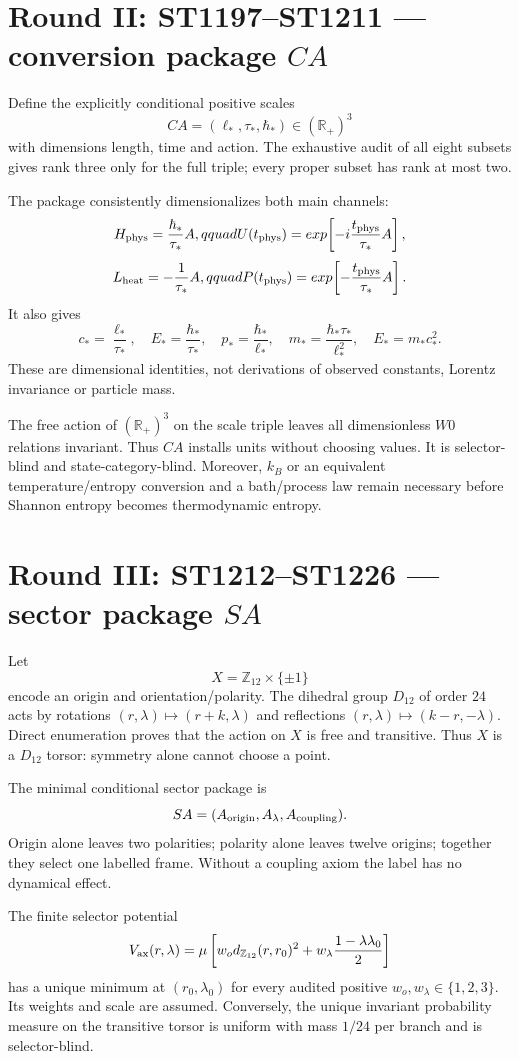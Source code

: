 \documentclass[11pt,a4paper]{article}
\begin{document}
\section{Round II: ST1197--ST1211 --- conversion package $CA$}

Define the explicitly conditional positive scales
\[
 CA=(\ell_*,\tau_*,\hbar_*)\in(\mathbb R_+)^3
\]
with dimensions length, time and action.  The exhaustive audit of all eight
subsets gives rank three only for the full triple; every proper subset has rank
at most two.

The package consistently dimensionalizes both main channels:
\[
 H_{\rm phys}=\frac{\hbar_*}{\tau_*}A,qquad
 U(t_{\rm phys})=exp\!\left[-i\frac{t_{\rm phys}}{\tau_*}A\right],
\]
\[
 L_{\rm heat}=-\frac1{\tau_*}A,qquad
 P(t_{\rm phys})=exp\!\left[-\frac{t_{\rm phys}}{\tau_*}A\right].
\]
It also gives
\[
 c_*=\frac{\ell_*}{\tau_*},\quad
 E_*=\frac{\hbar_*}{\tau_*},\quad
 p_*=\frac{\hbar_*}{\ell_*},\quad
 m_*=\frac{\hbar_*\tau_*}{\ell_*^2},\quad E_*=m_*c_*^2.
\]
These are dimensional identities, not derivations of observed constants,
Lorentz invariance or particle mass.

The free action of $(\mathbb R_+)^3$ on the scale triple leaves all
dimensionless $W0$ relations invariant.  Thus $CA$ installs units without
choosing values.  It is selector-blind and state-category-blind.  Moreover,
$k_B$ or an equivalent temperature/entropy conversion and a bath/process law
remain necessary before Shannon entropy becomes thermodynamic entropy.

\section{Round III: ST1212--ST1226 --- sector package $SA$}

Let
\[
 X=\mathbb Z_{12}\times\{\pm1\}
\]
encode an origin and orientation/polarity.  The dihedral group $D_{12}$ of
order $24$ acts by rotations
$(r,\lambda)\mapsto(r+k,\lambda)$ and reflections
$(r,\lambda)\mapsto(k-r,-\lambda)$.  Direct enumeration proves that the action
on $X$ is free and transitive.  Thus $X$ is a $D_{12}$ torsor: symmetry alone
cannot choose a point.

The minimal conditional sector package is
\[
 SA=(A_{\rm origin},A_\lambda,A_{\rm coupling}).
\]
Origin alone leaves two polarities; polarity alone leaves twelve origins;
together they select one labelled frame.  Without a coupling axiom the label
has no dynamical effect.

The finite selector potential
\[
 V_{\rm ax}(r,\lambda)=\mu\left[
 w_o d_{\mathbb Z_{12}}(r,r_0)^2+
 w_\lambda\frac{1-\lambda\lambda_0}{2}\right]
\]
has a unique minimum at $(r_0,\lambda_0)$ for every audited positive
$w_o,w_\lambda\in\{1,2,3\}$.  Its weights and scale are assumed.  Conversely,
the unique invariant probability measure on the transitive torsor is uniform
with mass $1/24$ per branch and is selector-blind.
\end{document}
